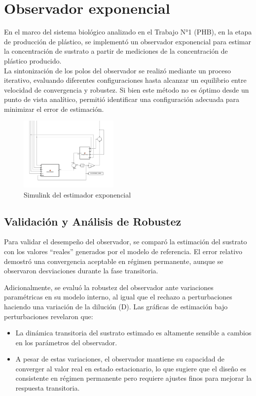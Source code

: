 \documentclass[letterpaper, 10 pt, conference]{ieeeconf}  %
\begin{document}
\section{Observador exponencial}

En el marco del sistema biológico analizado en el Trabajo N°1 (PHB), en la etapa de producción de plástico, se implementó un observador exponencial para estimar la concentración de sustrato a partir de mediciones de la concentración de plástico producido. \\
La sintonización de los polos del observador se realizó mediante un proceso iterativo, evaluando diferentes configuraciones hasta alcanzar un equilibrio entre velocidad de convergencia y robustez. Si bien este método no es óptimo desde un punto de vista analítico, permitió identificar una configuración adecuada para minimizar el error de estimación.

\begin{figure}[H]
  \centering
  \includegraphics[width=0.43\textwidth]{./Images_tp2/estimadorExponencial.png}
  \caption{Simulink del estimador exponencial}
\end{figure}

\subsection{Validación y Análisis de Robustez}

Para validar el desempeño del observador, se comparó la estimación del sustrato con los valores ``reales'' generados por el modelo de referencia. El error relativo demostró una convergencia aceptable en régimen permanente, aunque se observaron desviaciones durante la fase transitoria.

Adicionalmente, se evaluó la robustez del observador ante variaciones paramétricas en su modelo interno, al igual que el rechazo a perturbaciones haciendo una variación de la dilución (D). Las gráficas de estimación bajo perturbaciones revelaron que:

\begin{itemize}
    \item{La dinámica transitoria del sustrato estimado es altamente sensible a cambios en los parámetros del observador.}
    \item{A pesar de estas variaciones, el observador mantiene su capacidad de converger al valor real en estado estacionario, lo que sugiere que el diseño es consistente en régimen permanente pero requiere ajustes finos para mejorar la respuesta transitoria.}
\end{itemize}
\end{document}

